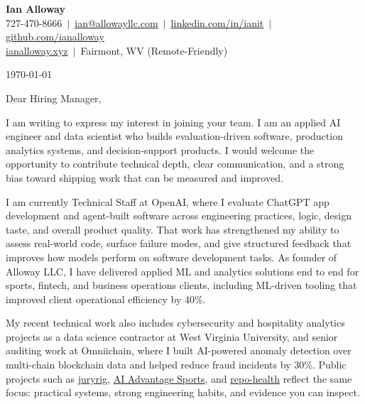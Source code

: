 \documentclass[11pt,letterpaper]{article}
\begin{document}
\begin{center}
    {\LARGE\bfseries Ian Alloway} \\[4pt]
    727-470-8666 \,$\vert$\,
    \href{mailto:ian@allowayllc.com}{ian@allowayllc.com} \,$\vert$\,
    \href{https://linkedin.com/in/ianit}{linkedin.com/in/ianit} \,$\vert$\,
    \href{https://github.com/ianalloway}{github.com/ianalloway} \\[2pt]
    \href{https://ianalloway.xyz}{ianalloway.xyz} \,$\vert$\,
    Fairmont, WV (Remote-Friendly)
\end{center}

\vspace{12pt}

\today

\vspace{12pt}

Dear Hiring Manager,

\vspace{6pt}

I am writing to express my interest in joining your team. I am an applied AI engineer and data scientist who builds evaluation-driven software, production analytics systems, and decision-support products. I would welcome the opportunity to contribute technical depth, clear communication, and a strong bias toward shipping work that can be measured and improved.

\vspace{6pt}

I am currently Technical Staff at OpenAI, where I evaluate ChatGPT app development and agent-built software across engineering practices, logic, design taste, and overall product quality. That work has strengthened my ability to assess real-world code, surface failure modes, and give structured feedback that improves how models perform on software development tasks. As founder of Alloway LLC, I have delivered applied ML and analytics solutions end to end for sports, fintech, and business operations clients, including ML-driven tooling that improved client operational efficiency by 40\%.

\vspace{6pt}

My recent technical work also includes cybersecurity and hospitality analytics projects as a data science contractor at West Virginia University, and senior auditing work at Omniichain, where I built AI-powered anomaly detection over multi-chain blockchain data and helped reduce fraud incidents by 30\%. Public projects such as \href{https://github.com/ianalloway/juryrig}{juryrig}, \href{https://aiadvantagesports.com}{AI Advantage Sports}, and \href{https://github.com/ianalloway/repo-health}{repo-health} reflect the same focus: practical systems, strong engineering habits, and evidence you can inspect.
\end{document}
